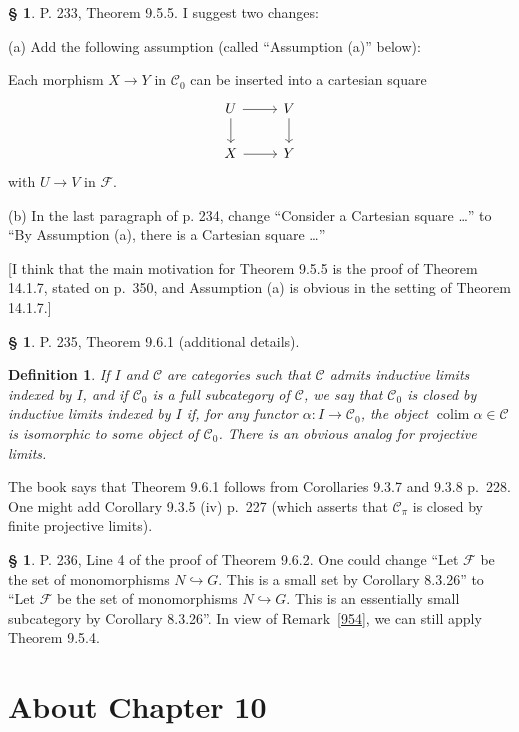\documentclass[12pt]{article}
\newtheorem{df}[thm]{Definition}%
\theoremstyle{remark}
\theoremstyle{definition}
\newtheorem{s}[thm]{\S}
\newcommand{\cc}{\mathcal}
\newcommand{\C}{\mathcal C}
\newcommand{\incl}{\hookrightarrow}
\DeclareMathOperator*{\co}{colim}
\begin{document}
%
%
\begin{s}\label{t955} 
P. 233, Theorem 9.5.5. I suggest two changes: 

\noindent(a) Add the following assumption (called ``Assumption (a)'' below): 

Each morphism $X\to Y$ in $\C_0$ can be inserted into a cartesian square
$$
\begin{tikzcd}
U\ar{r}\ar{d}&V\ar{d}\\ X\ar{r}&Y
\end{tikzcd}
$$ 
with $U\to V$ in $\cc F$. 

\noindent(b) In the last paragraph of p. 234, change ``Consider a Cartesian square \dots'' to ``By Assumption (a), there is a Cartesian square \dots'' 

[I think that the main motivation for Theorem 9.5.5 is the proof of Theorem 14.1.7, stated on p.~350, and Assumption (a) is obvious in the setting of Theorem 14.1.7.] 
\end{s}
%
%
\begin{s} 
P. 235, Theorem 9.6.1 (additional details).
%
\begin{df}\label{cb}
If $I$ and $\C$ are categories such that $\C$ admits inductive limits indexed by $I$, and if $\C_0$ is a full subcategory of $\C$, we say that $\C_0$ is {\em closed by inductive limits indexed by} $I$ if, for any functor $\alpha:I\to\C_0$, the object $\co\alpha\in\C$ is isomorphic to some object of $\C_0$. There is an obvious analog for projective limits.
\end{df}

The book says that Theorem 9.6.1 follows from Corollaries 9.3.7 and 9.3.8 p.~228. One might add Corollary 9.3.5 (iv) p.~227 (which asserts that $\C_\pi$ is closed by finite projective limits).
\end{s}
%
%
\begin{s} 
P. 236, Line 4 of the proof of Theorem 9.6.2. One could change ``Let $\cc F$ be the set of monomorphisms $N\incl G$. This is a small set by Corollary 8.3.26'' to ``Let $\cc F$ be the set of monomorphisms $N\incl G$. This is an essentially small subcategory by Corollary 8.3.26''. In view of Remark~\ref{954}, we can still apply Theorem 9.5.4.
\end{s}
%
%
\section{About Chapter 10}
%
\end{document}
